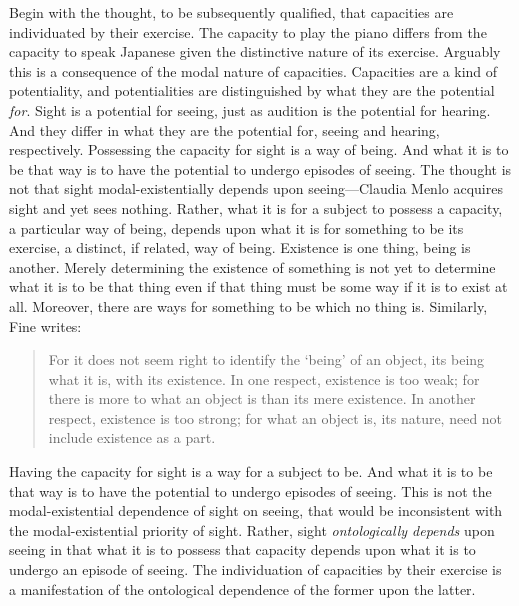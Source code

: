 \documentclass[12pt]{article}
\begin{document}
Begin with the thought, to be subsequently qualified, that capacities are individuated by their exercise. The capacity to play the piano differs from the capacity to speak Japanese given the distinctive nature of its exercise. Arguably this is a consequence of the modal nature of capacities. Capacities are a kind of potentiality, and potentialities are distinguished by what they are the potential \emph{for}. Sight is a potential for seeing, just as audition is the potential for hearing. And they differ in what they are the potential for, seeing and hearing, respectively. Possessing the capacity for sight is a way of being. And what it is to be that way is to have the potential to undergo episodes of seeing. The thought is not that sight modal-existentially depends upon seeing---Claudia Menlo acquires sight and yet sees nothing. Rather, what it is for a subject to possess a capacity, a particular way of being, depends upon what it is for something to be its exercise, a distinct, if related, way of being. Existence is one thing, being is another. Merely determining the existence of something is not yet to determine what it is to be that thing even if that thing must be some way if it is to exist at all. Moreover, there are ways for something to be which no thing is. Similarly, Fine writes:
\begin{quote}
	For it does not seem right to identify the `being' of an object, its being what it is, with its existence. In one respect, existence is too weak; for there is more to what an object is than its mere existence. In another respect, existence is too strong; for what an object is, its nature, need not include existence as a part. \citep[274]{Fine:1995ls}
\end{quote}
Having the capacity for sight is a way for a subject to be. And what it is to be that way is to have the potential to undergo episodes of seeing. This is not the modal-existential dependence of sight on seeing, that would be inconsistent with the modal-existential priority of sight. Rather, sight \emph{ontologically depends} upon seeing in that what it is to possess that capacity depends upon what it is to undergo an episode of seeing. The individuation of capacities by their exercise is a manifestation of the ontological dependence of the former upon the latter.
\end{document}
